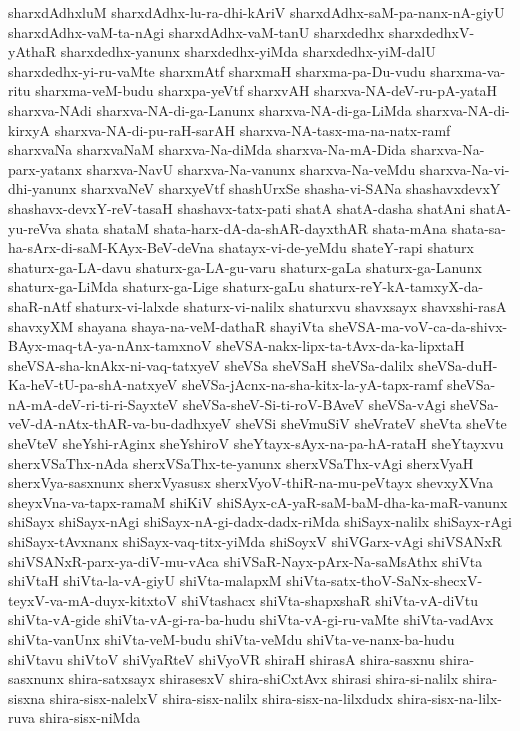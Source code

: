 {sharxdAdhxluM
sharxdAdhx-lu-ra-dhi-kAriV
sharxdAdhx-saM-pa-nanx-nA-giyU
sharxdAdhx-vaM-ta-nAgi
sharxdAdhx-vaM-tanU
sharxdedhx
sharxdedhxV-yAthaR
sharxdedhx-yanunx
sharxdedhx-yiMda
sharxdedhx-yiM-dalU
sharxdedhx-yi-ru-vaMte
sharxmAtf
sharxmaH
sharxma-pa-Du-vudu
sharxma-va-ritu
sharxma-veM-budu
sharxpa-yeVtf
sharxvAH
sharxva-NA-deV-ru-pA-yataH
sharxva-NAdi
sharxva-NA-di-ga-Lanunx
sharxva-NA-di-ga-LiMda
sharxva-NA-di-kirxyA
sharxva-NA-di-pu-raH-sarAH
sharxva-NA-tasx-ma-na-natx-ramf
sharxvaNa
sharxvaNaM
sharxva-Na-diMda
sharxva-Na-mA-Dida
sharxva-Na-parx-yatanx
sharxva-NavU
sharxva-Na-vanunx
sharxva-Na-veMdu
sharxva-Na-vi-dhi-yanunx
sharxvaNeV
sharxyeVtf
shashUrxSe
shasha-vi-SANa
shashavxdevxY
shashavx-devxY-reV-tasaH
shashavx-tatx-pati
shatA
shatA-dasha
shatAni
shatA-yu-reVva
shata
shataM
shata-harx-dA-da-shAR-dayxthAR
shata-mAna
shata-sa-ha-sArx-di-saM-KAyx-BeV-deVna
shatayx-vi-de-yeMdu
shateY-rapi
shaturx
shaturx-ga-LA-davu
shaturx-ga-LA-gu-varu
shaturx-gaLa
shaturx-ga-Lanunx
shaturx-ga-LiMda
shaturx-ga-Lige
shaturx-gaLu
shaturx-reY-kA-tamxyX-da-shaR-nAtf
shaturx-vi-lalxde
shaturx-vi-nalilx
shaturxvu
shavxsayx
shavxshi-rasA
shavxyXM
shayana
shaya-na-veM-dathaR
shayiVta
sheVSA-ma-voV-ca-da-shivx-BAyx-maq-tA-ya-nAnx-tamxnoV
sheVSA-nakx-lipx-ta-tAvx-da-ka-lipxtaH
sheVSA-sha-knAkx-ni-vaq-tatxyeV
sheVSa
sheVSaH
sheVSa-dalilx
sheVSa-duH-Ka-heV-tU-pa-shA-natxyeV
sheVSa-jAcnx-na-sha-kitx-la-yA-tapx-ramf
sheVSa-nA-mA-deV-ri-ti-ri-SayxteV
sheVSa-sheV-Si-ti-roV-BAveV
sheVSa-vAgi
sheVSa-veV-dA-nAtx-thAR-va-bu-dadhxyeV
sheVSi
sheVmuSiV
sheVrateV
sheVta
sheVte
sheVteV
sheYshi-rAginx
sheYshiroV
sheYtayx-sAyx-na-pa-hA-rataH
sheYtayxvu
sherxVSaThx-nAda
sherxVSaThx-te-yanunx
sherxVSaThx-vAgi
sherxVyaH
sherxVya-sasxnunx
sherxVyasusx
sherxVyoV-thiR-na-mu-peVtayx
shevxyXVna
sheyxVna-va-tapx-ramaM
shiKiV
shiSAyx-cA-yaR-saM-baM-dha-ka-maR-vanunx
shiSayx
shiSayx-nAgi
shiSayx-nA-gi-dadx-dadx-riMda
shiSayx-nalilx
shiSayx-rAgi
shiSayx-tAvxnanx
shiSayx-vaq-titx-yiMda
shiSoyxV
shiVGarx-vAgi
shiVSANxR
shiVSANxR-parx-ya-diV-mu-vAca
shiVSaR-Nayx-pArx-Na-saMsAthx
shiVta
shiVtaH
shiVta-la-vA-giyU
shiVta-malapxM
shiVta-satx-thoV-SaNx-shecxV-teyxV-va-mA-duyx-kitxtoV
shiVtashacx
shiVta-shapxshaR
shiVta-vA-diVtu
shiVta-vA-gide
shiVta-vA-gi-ra-ba-hudu
shiVta-vA-gi-ru-vaMte
shiVta-vadAvx
shiVta-vanUnx
shiVta-veM-budu
shiVta-veMdu
shiVta-ve-nanx-ba-hudu
shiVtavu
shiVtoV
shiVyaRteV
shiVyoVR
shiraH
shirasA
shira-sasxnu
shira-sasxnunx
shira-satxsayx
shirasesxV
shira-shiCxtAvx
shirasi
shira-si-nalilx
shira-sisxna
shira-sisx-nalelxV
shira-sisx-nalilx
shira-sisx-na-lilxdudx
shira-sisx-na-lilx-ruva
shira-sisx-niMda
}
